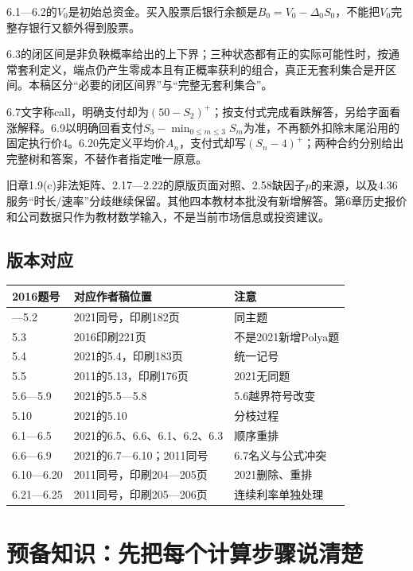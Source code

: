 \documentclass[11pt,a4paper,UTF8,fontset=fandol]{ctexart}
\begin{document}
6.1---6.2的\(V_0\)是初始总资金。买入股票后银行余额是\(B_0=V_0-\Delta_0S_0\)，不能把\(V_0\)完整存银行又额外得到股票。

6.3的闭区间是非负鞅概率给出的上下界；三种状态都有正的实际可能性时，按通常套利定义，端点仍产生零成本且有正概率获利的组合，真正无套利集合是开区间。本稿区分``必要的闭区间界''与``完整无套利集合''。

6.7文字称call，明确支付却为\((50-S_2)^+\)；按支付式完成看跌解答，另给字面看涨解释。6.9以明确回看支付\(S_3-\min_{0\le m\le3}S_m\)为准，不再额外扣除末尾沿用的固定执行价4。6.20先定义平均价\(A_n\)，支付式却写\((S_n-4)^+\)；两种合约分别给出完整树和答案，不替作者指定唯一原意。

旧章1.9(c)非法矩阵、2.17---2.22的原版页面对照、2.58缺因子\(p\)的来源，以及4.36服务``时长/速率''分歧继续保留。其他四本教材本批没有新增解答。第6章历史报价和公司数据只作为教材数学输入，不是当前市场信息或投资建议。

\subsection{版本对应}\label{ux7248ux672cux5bf9ux5e94}

\begin{longtable}[]{@{}p{.17\linewidth}p{.52\linewidth}p{.24\linewidth}@{}}
\toprule\noalign{}
2016题号 & 对应作者稿位置 & 注意 \\
\midrule\noalign{}
\endhead
\bottomrule\noalign{}
\endlastfoot
5.1---5.2 & 2021同号，印刷182页 & 同主题 \\
5.3 & 2016印刷221页 & 不是2021新增Polya题 \\
5.4 & 2021的5.4，印刷183页 & 统一记号 \\
5.5 & 2011的5.13，印刷176页 & 2021无同题 \\
5.6---5.9 & 2021的5.5---5.8 & 5.6越界符号改变 \\
5.10 & 2021的5.10 & 分枝过程 \\
6.1---6.5 & 2021的6.5、6.6、6.1、6.2、6.3 & 顺序重排 \\
6.6---6.9 & 2021的6.7---6.10；2011同号 & 6.7名义与公式冲突 \\
6.10---6.20 & 2011同号，印刷204---205页 & 2021删除、重排 \\
6.21---6.25 & 2011同号，印刷205---206页 & 连续利率单独处理 \\
\end{longtable}

\section{预备知识：先把每个计算步骤说清楚}\label{ux9884ux5907ux77e5ux8bc6ux5148ux628aux6bcfux4e2aux8ba1ux7b97ux6b65ux9aa4ux8bf4ux6e05ux695a}
\end{document}
